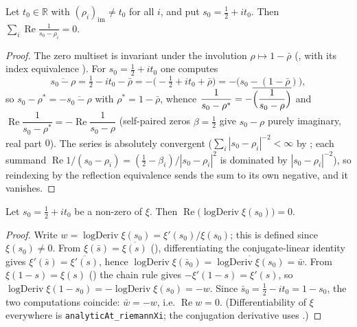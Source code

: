 \begin{lemma}
\label{lem:le_refl_sum_zero}
\leanok
{}
Let $t_0\in\mathbb R$ with $(\rho_i)_{\mathrm{im}}\ne t_0$ for all $i$, and put
$s_0=\tfrac12+it_0$. Then $\displaystyle\sum_i\operatorname{Re}\frac1{s_0-\rho_i}=0$.
\end{lemma}

\begin{proof}
\leanok
The zero multiset is invariant under the involution $\rho\mapsto 1-\bar\rho$
(,  with
its index equivalence ).
For $s_0=\tfrac12+it_0$ one computes
\[
  \overline{s_0-\rho}=\tfrac12-it_0-\bar\rho=-\bigl(-\tfrac12+it_0+\bar\rho\bigr)
  =-\bigl(s_0-(1-\bar\rho)\bigr),
\]
so $s_0-\rho^{*}=-\overline{s_0-\rho}$ with $\rho^{*}=1-\bar\rho$, whence
$\dfrac1{s_0-\rho^{*}}=-\overline{\Bigl(\dfrac1{s_0-\rho}\Bigr)}$ and
$\operatorname{Re}\dfrac1{s_0-\rho^{*}}=-\operatorname{Re}\dfrac1{s_0-\rho}$
(self-paired zeros $\beta=\tfrac12$ give $s_0-\rho$ purely imaginary, real part $0$).
The series is absolutely convergent ($\sum_i|s_0-\rho_i|^{-2}<\infty$ by
; each summand
$\operatorname{Re}1/(s_0-\rho_i)=(\tfrac12-\beta_i)/|s_0-\rho_i|^2$ is dominated by
$|s_0-\rho_i|^{-2}$), so reindexing by the reflection equivalence sends the sum to its
own negative, and it vanishes.
\end{proof}

\begin{lemma}
\label{lem:le_re_logderiv_zero}
\leanok
Let $s_0=\tfrac12+it_0$ be a non-zero of $\xi$. Then
$\operatorname{Re}\bigl(\operatorname{logDeriv}\xi(s_0)\bigr)=0$.
\end{lemma}

\begin{proof}
\leanok
Write $w=\operatorname{logDeriv}\xi(s_0)=\xi'(s_0)/\xi(s_0)$; this is defined since
$\xi(s_0)\ne 0$. From $\xi(\bar s)=\overline{\xi(s)}$
(), differentiating the conjugate-linear
identity gives $\xi'(\bar s)=\overline{\xi'(s)}$, hence
$\operatorname{logDeriv}\xi(\bar s_0)=\overline{\operatorname{logDeriv}\xi(s_0)}=\bar w$.
From $\xi(1-s)=\xi(s)$ () the chain rule
gives $-\xi'(1-s)=\xi'(s)$, so
$\operatorname{logDeriv}\xi(1-s_0)=-\operatorname{logDeriv}\xi(s_0)=-w$.
Since $\bar s_0=\tfrac12-it_0=1-s_0$, the two computations coincide: $\bar w=-w$, i.e.
$\operatorname{Re}w=0$. (Differentiability of $\xi$ everywhere is
\texttt{analyticAt\_riemannXi}; the conjugation derivative uses
.)
\end{proof}

